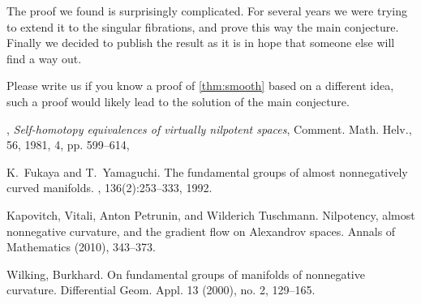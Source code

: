 \documentclass{amsart}
\begin{document}
The proof we found is surprisingly complicated.
For several years we were trying to extend it to the singular fibrations, and prove this way the main conjecture.
Finally we decided to publish the result as it is in hope that someone else will find a way out.

Please write us if you know a proof of \ref{thm:smooth} based on a different idea,
such a proof would likely lead to the solution of the main conjecture.

\small

%

\begin{thebibliography}{HMR75}
,
 \textit{Self-homotopy equivalences of virtually nilpotent spaces},
{Comment. Math. Helv.},
{56},
{1981},
{4},
pp. {599--614},

K.~Fukaya and T.~Yamaguchi.
\newblock The fundamental groups of almost nonnegatively curved manifolds.
, 136(2):253--333, 1992.


 Kapovitch, Vitali, Anton Petrunin, and Wilderich Tuschmann. 
\newblock Nilpotency, almost nonnegative curvature, and the gradient flow on Alexandrov spaces. 
\newblock Annals of Mathematics (2010), 343--373.

Wilking, Burkhard. \newblock On fundamental groups of manifolds of nonnegative curvature. \newblock  Differential Geom. Appl.  13  (2000),  no. 2, 129--165.
\end{thebibliography}
\end{document}
